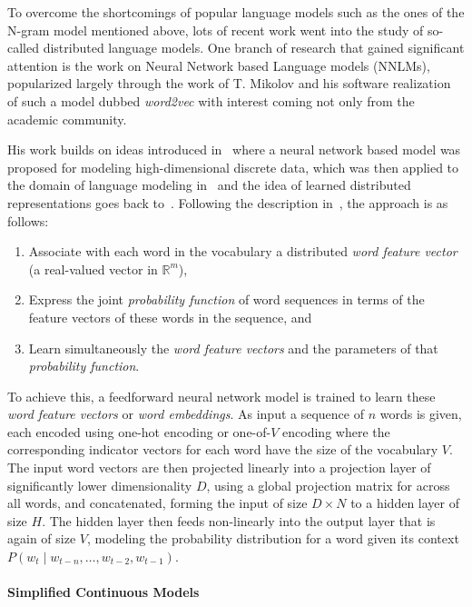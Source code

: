 To overcome the shortcomings of popular language models such as the ones of the N-gram model mentioned above, lots of recent work went into the study of so-called distributed language models. One branch of research that gained significant attention is the work on Neural Network based Language models (NNLMs), popularized largely through the work of T. Mikolov and his software realization of such a model dubbed \emph{word2vec} with interest coming not only from the academic community.

His work builds on ideas introduced in~\cite{Bengio:2000aa} where a neural network based model was proposed for modeling high-dimensional discrete data, which was then applied to the domain of language modeling in~\cite{bengio2003neural} and the idea of learned distributed representations goes back to~\cite{Hinton:1986aa}. Following the description in~\cite{Bengio:2000aa}, the approach is as follows:

\begin{enumerate}
  \item Associate with each word in the vocabulary a distributed \emph{word feature vector} (a real-valued vector in $\mathbb{R}^m$),
  \item Express the joint \emph{probability function} of word sequences in terms of the feature vectors of these words in the sequence, and
  \item Learn simultaneously the \emph{word feature vectors} and the parameters of that \emph{probability function}.
\end{enumerate}

To achieve this, a feedforward neural network model is trained to learn these \emph{word feature vectors} or \emph{word embeddings}. As input a sequence of $n$ words is given, each encoded using one-hot encoding or one-of-$V$ encoding where the corresponding indicator vectors for each word have the size of the vocabulary $V$. The input word vectors are then projected linearly into a projection layer of significantly lower dimensionality $D$, using a global projection matrix for across all words, and concatenated, forming the input of size $D \times N$ to a hidden layer of size $H$. The hidden layer then feeds non-linearly into the output layer that is again of size $V$, modeling the probability distribution for a word given its context $P(w_t \mid w_{t - n}, \ldots, w_{t - 2}, w_{t - 1})$.

\paragraph{Simplified Continuous Models}


